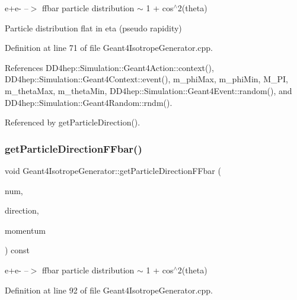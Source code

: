 e+e-\/ --$>$ ffbar particle distribution $\sim$ 1 + cos$^\wedge$2(theta) 

Particle distribution flat in eta (pseudo rapidity) 

Definition at line 71 of file Geant4\+Isotrope\+Generator.\+cpp.



References D\+D4hep\+::\+Simulation\+::\+Geant4\+Action\+::context(), D\+D4hep\+::\+Simulation\+::\+Geant4\+Context\+::event(), m\+\_\+phi\+Max, m\+\_\+phi\+Min, M\+\_\+\+PI, m\+\_\+theta\+Max, m\+\_\+theta\+Min, D\+D4hep\+::\+Simulation\+::\+Geant4\+Event\+::random(), and D\+D4hep\+::\+Simulation\+::\+Geant4\+Random\+::rndm().



Referenced by get\+Particle\+Direction().

\hypertarget{class_d_d4hep_1_1_simulation_1_1_geant4_isotrope_generator_a326bedf16953d724e6865a160a1b1b37}{}\label{class_d_d4hep_1_1_simulation_1_1_geant4_isotrope_generator_a326bedf16953d724e6865a160a1b1b37} 
\subsubsection{\texorpdfstring{get\+Particle\+Direction\+F\+Fbar()}{getParticleDirectionFFbar()}}
{\footnotesize\ttfamily void Geant4\+Isotrope\+Generator\+::get\+Particle\+Direction\+F\+Fbar (\begin{DoxyParamCaption}\item[{int}]{num,  }\item[{R\+O\+O\+T\+::\+Math\+::\+X\+Y\+Z\+Vector \&}]{direction,  }\item[{double \&}]{momentum }\end{DoxyParamCaption}) const\hspace{0.3cm}{\ttfamily [protected]}}



e+e-\/ --$>$ ffbar particle distribution $\sim$ 1 + cos$^\wedge$2(theta) 



Definition at line 92 of file Geant4\+Isotrope\+Generator.\+cpp.



